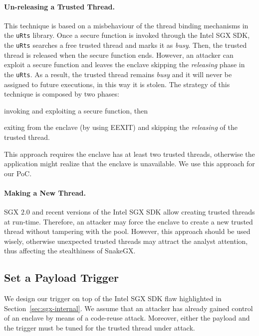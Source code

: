 \paragraph{\textbf{Un-releasing a Trusted Thread.}}
This technique is based on a misbehaviour of the thread binding mechanisms in 
the \texttt{uRts} library.
Once a secure function is invoked through the Intel SGX SDK, the
\texttt{uRts} searches a free trusted thread and marks it as \emph{busy}.
Then, the trusted thread is released when the secure function ends.
However, an attacker can exploit a secure function and leaves the enclave 
skipping the \emph{releasing} phase in the \texttt{uRts}.
As a result, the trusted thread remains \emph{busy} and it will never
be assigned to future executions, in this way it is stolen.
The strategy of this technique is composed by two phases:
\begin{enumerate*}[label=(\roman*)]
	\item invoking and exploiting a secure function, then
	\item exiting from the enclave (\eg by using EEXIT) and 
	skipping the \emph{releasing} of the trusted thread.
\end{enumerate*}
This approach requires the enclave has at least two trusted threads, otherwise 
the application might realize that the enclave is unavailable.
We use this approach for our PoC.

\paragraph{\textbf{Making a New Thread.}}
SGX $2.0$ and recent versions of the Intel SGX SDK allow creating trusted 
threads at run-time.
Therefore, an attacker may force the enclave to create a new trusted thread 
without tampering with the pool.
However, this approach should be used wisely, otherwise unexpected trusted 
threads may attract the analyst attention, thus affecting the stealthiness of 
SnakeGX.

\subsection{Set a Payload Trigger}
\label{ssec:set-a-payload-trigger}
We design our trigger on top of the Intel SGX SDK flaw highlighted in 
Section~\ref{sec:sgx-internal}.
We assume that an attacker has already gained control of an enclave by means
of a code-reuse attack.
Moreover, either the payload and the trigger must be tuned for the trusted 
thread under attack.

